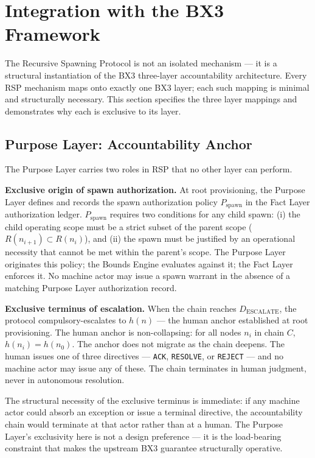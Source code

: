 \section{Integration with the BX3 Framework}
\label{sec:rs-integration}

The Recursive Spawning Protocol is not an isolated mechanism — it is a structural instantiation of the BX3 three-layer accountability architecture. Every RSP mechanism maps onto exactly one BX3 layer; each such mapping is minimal and structurally necessary. This section specifies the three layer mappings and demonstrates why each is exclusive to its layer.

\subsection{Purpose Layer: Accountability Anchor}
\label{sec:rs-purpose-anchor}

The Purpose Layer carries two roles in RSP that no other layer can perform.

\medskip
\noindent\textbf{Exclusive origin of spawn authorization.} At root provisioning, the Purpose Layer defines and records the spawn authorization policy $P_{\mathrm{spawn}}$ in the Fact Layer authorization ledger. $P_{\mathrm{spawn}}$ requires two conditions for any child spawn: (i) the child operating scope must be a strict subset of the parent scope ($R(n_{i+1}) \subset R(n_i)$), and (ii) the spawn must be justified by an operational necessity that cannot be met within the parent's scope. The Purpose Layer originates this policy; the Bounds Engine evaluates against it; the Fact Layer enforces it. No machine actor may issue a spawn warrant in the absence of a matching Purpose Layer authorization record.

\medskip
\noindent\textbf{Exclusive terminus of escalation.} When the chain reaches $D_{\mathrm{ESCALATE}}$, the protocol compulsory-escalates to $h(n)$ — the human anchor established at root provisioning. The human anchor is non-collapsing: for all nodes $n_i$ in chain $C$, $h(n_i) = h(n_0)$. The anchor does not migrate as the chain deepens. The human issues one of three directives — \texttt{ACK}, \texttt{RESOLVE}, or \texttt{REJECT} — and no machine actor may issue any of these. The chain terminates in human judgment, never in autonomous resolution.

The structural necessity of the exclusive terminus is immediate: if any machine actor could absorb an exception or issue a terminal directive, the accountability chain would terminate at that actor rather than at a human. The Purpose Layer's exclusivity here is not a design preference — it is the load-bearing constraint that makes the upstream BX3 guarantee structurally operative.


